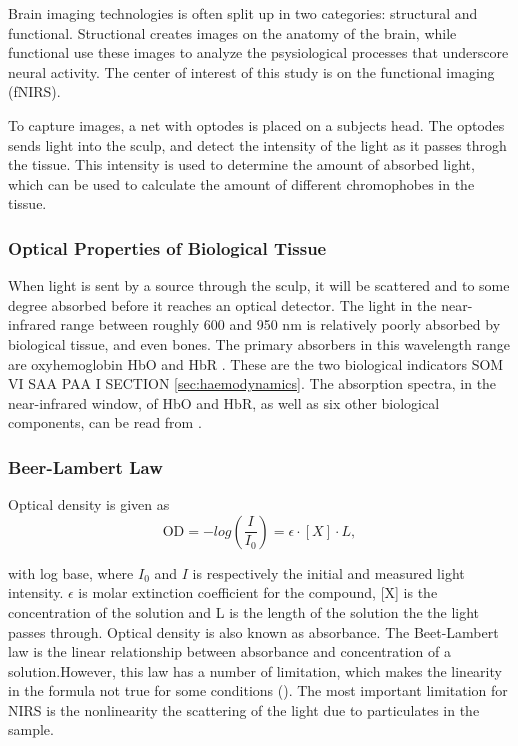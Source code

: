 Brain imaging technologies is often split up in two categories: structural and functional. Structional creates images on the anatomy of the brain, while functional use these images to analyze the psysiological processes that underscore neural activity\cite{Carter20101}. The center of interest of this study is on the functional imaging (fNIRS).

To capture images, a net with optodes is placed on a subjects head. The optodes sends light into the sculp, and detect the intensity of the light as it passes throgh the tissue. This intensity is used to determine the amount of absorbed light, which can be used to calculate the amount of different chromophobes in the tissue.

\subsubsection{Optical Properties of Biological Tissue}
When light is sent by a source through the sculp, it will be scattered and to some degree absorbed before it reaches an optical detector\cite{opticalMethods}. The light in the near-infrared range between roughly 600 and 950 nm is relatively poorly absorbed by biological tissue, and even bones. The primary absorbers in this wavelength range are oxyhemoglobin HbO and HbR \cite{nonInvasiveImaging}. These are the two biological indicators SOM VI SAA PAA I SECTION \ref{sec:haemodynamics}. The absorption spectra, in the near-infrared window, of HbO and HbR, as well as six other biological components, can be read from . 

\subsubsection{Beer-Lambert Law}
Optical density is given as
\begin{equation}
\text{OD}=-log(\frac{I}{I_0}) = \epsilon \cdot [X] \cdot L,
\end{equation}

with log base, where $I_0$ and $I$ is respectively the initial and measured light intensity. $\epsilon$ is molar extinction coefficient for the compound, [X] is the concentration of the solution and L is the length of the solution the the light passes through. Optical density is also known as absorbance. The Beet-Lambert law is the linear relationship between absorbance and concentration of a solution.However, this law has a number of limitation, which makes the linearity in the formula not true for some conditions (). The most important limitation for NIRS is the nonlinearity the scattering of the light due to particulates in the sample.


